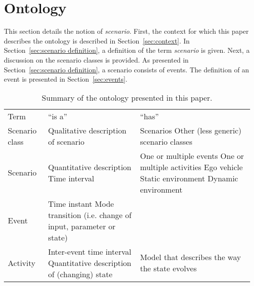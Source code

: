 \section{Ontology}
\label{sec:ontology}

This section details the notion of \emph{scenario}. First, the context for which this paper describes the ontology is described in Section~\ref{sec:context}. In Section~\ref{sec:scenario definition}, a definition of the term \emph{scenario} is given. Next, a discussion on the scenario classes is provided. As presented in Section~\ref{sec:scenario definition}, a scenario consists of events. The definition of an event is presented in Section~\ref{sec:events}.

\begin{table}
	\begin{center}
		\caption{Summary of the ontology presented in this paper.}
		\label{tab:ontology}
		\begin{tabularx}{\linewidth}{p{3em} X X}
			\toprule
			Term & ``is a'' & ``has'' \\ \otoprule
			Scenario class & Qualitative description of scenario & Scenarios \newline Other (less generic) scenario classes \\
			Scenario & Quantitative description \newline Time interval & One or multiple events \newline One or multiple activities \newline Ego vehicle \newline Static environment \newline Dynamic environment \\
			Event & Time instant \newline Mode transition (i.e. change of input, parameter or state) & \\
			Activity & Inter-event time interval \newline Quantitative description of (changing) state & Model that describes the way the state evolves \\
			\bottomrule
		\end{tabularx}
	\end{center}
\end{table}





